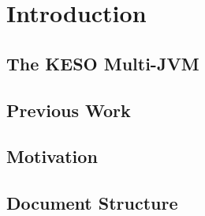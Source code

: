 
\chapter{Introduction}
	\label{chapter:intro}

	\section{The KESO Multi-JVM}
		\label{sec:intro:keso}
	\section{Previous Work}
		\label{sec:intro:prev}
	\section{Motivation}
		\label{sec:intro:motivation}
	\section{Document Structure}
		\label{sec:intro:document-structure}
